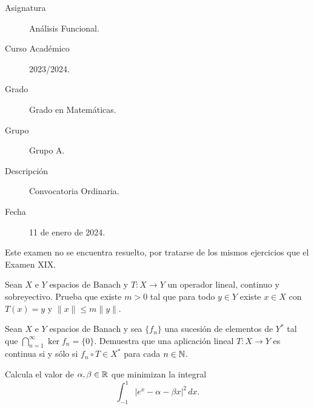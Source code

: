 \documentclass[12pt]{article}
\begin{document}

    
    

    \begin{description}
        \item[Asignatura] Análisis Funcional.
        \item[Curso Académico] 2023/2024.
        \item[Grado] Grado en Matemáticas.
        \item[Grupo] Grupo A.
        \item[Descripción] Convocatoria Ordinaria.
        \item[Fecha] 11 de enero de 2024.
    
    \end{description}
    \newpage



    \begin{observacion}
        Este examen no se encuentra resuelto, por tratarse de los mismos ejercicios que el Examen XIX.
    \end{observacion}

    
    \begin{ejercicio}
        Sean $X$ e $Y$ espacios de Banach y $T \colon X \longrightarrow Y$ un operador lineal, continuo y sobreyectivo. Prueba que existe $m > 0$ tal que para todo $y \in Y$ existe $x \in X$ con $T(x) = y$ y $\|x\| \leqslant m \|y\|$.
    \end{ejercicio}

    \begin{ejercicio}
        Sean $X$ e $Y$ espacios de Banach y sea $\{f_n\}$ una sucesión de elementos de $Y^*$ tal que $\bigcap\limits_{n=1}^\infty \ker f_n = \{0\}$. Demuestra que una aplicación lineal $T \colon X \longrightarrow Y$ es continua si y sólo si $f_n \circ T \in X^*$ para cada $n \in \mathbb{N}$.
    \end{ejercicio}

    \begin{ejercicio}
        Calcula el valor de $\alpha, \beta \in \mathbb{R}$ que minimizan la integral
        \[
            \int_{-1}^1 |e^x - \alpha - \beta x|^2 \, dx.
        \]
    \end{ejercicio}
\end{document}
